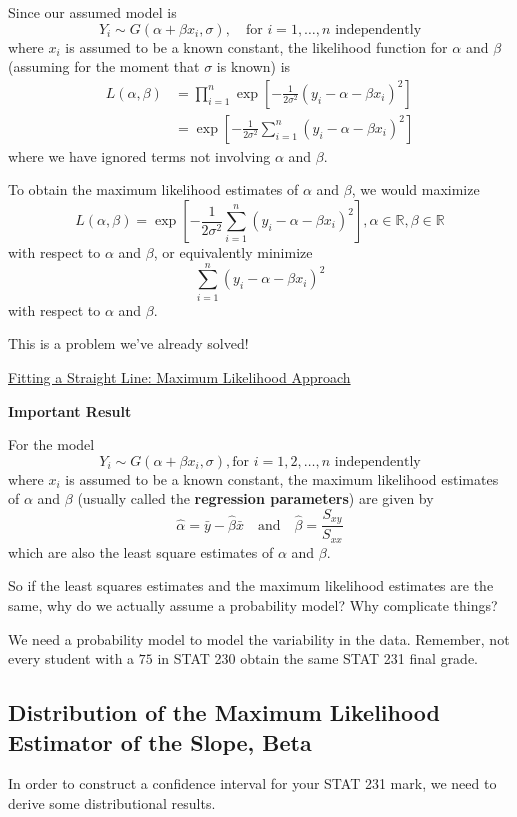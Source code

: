 Since our assumed model is
\[Y_{i} \sim G\left(\alpha+\beta x_{i}, \sigma\right), \quad \text{for } i=1, \ldots, n \text{ independently}\]
where $ x_i $ is assumed to be a known constant, the likelihood function for $ \alpha $
and $ \beta $ (assuming for the moment that $ \sigma $ is known) is
\[\begin{aligned}
        L(\alpha, \beta)
         & =\prod_{i=1}^{n} \exp \left[-\frac{1}{2 \sigma^{2}}\left(y_{i}-\alpha-\beta x_{i}\right)^{2}\right] \\
         & =\exp \left[-\frac{1}{2 \sigma^{2}} \sum_{i=1}^{n}\left(y_{i}-\alpha-\beta x_{i}\right)^{2}\right]
    \end{aligned}
\]
where we have ignored terms not involving $ \alpha $ and $ \beta $.

To obtain the maximum likelihood estimates of $ \alpha $ and $ \beta $,
we would maximize
\[L(\alpha, \beta)=\exp \left[-\frac{1}{2 \sigma^{2}} \sum_{i=1}^{n}\left(y_{i}-\alpha-\beta x_{i}\right)^{2}\right],
    \alpha \in \mathbb{R}, \beta \in \mathbb{R}\]
with respect to $ \alpha $ and $ \beta $, or equivalently minimize
\[\sum_{i=1}^{n}\left(y_{i}-\alpha-\beta x_{i}\right)^{2}\]
with respect to $ \alpha $ and $ \beta $.

This is a problem we've already solved!

\underline{Fitting a Straight Line: Maximum Likelihood Approach}

\textbf{Important Result}

For the model
\[Y_{i} \sim G\left(\alpha+\beta x_{i}, \sigma\right),
    \text{for } i=1,2, \ldots, n \text{ independently}\]
where $ x_i $ is assumed to be a known constant, the maximum likelihood estimates of $ \alpha $
and $ \beta $ (usually called the \textbf{regression parameters}) are given by
\[\hat{\alpha}=\bar{y}-\hat{\beta} \bar{x} \quad \text{and} \quad \hat{\beta}=\frac{S_{x y}}{S_{x x}}\]
which are also the least square estimates of $ \alpha $ and $ \beta $.

So if the least squares estimates and the maximum likelihood estimates are the same,
why do we actually assume a probability model? Why complicate things?

We need a probability model to model the variability in the data. Remember,
not every student with a $ 75 $ in STAT 230 obtain the same STAT 231 final grade.

\subsection{Distribution of the Maximum Likelihood Estimator of the Slope, Beta}
In order to construct a confidence interval for your STAT 231 mark, we need to derive
some distributional results.

